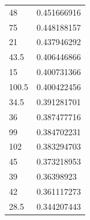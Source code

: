 \begin{longtable}{|l|l|}
	\rowcolor[HTML]{F8FF00} 
	48                                                      & 0.451666916                                                   \\
	\rowcolor[HTML]{F8FF00} 
	75                                                      & 0.448188157                                                   \\
	\rowcolor[HTML]{F8FF00} 
	21                                                      & 0.437946292                                                   \\
	\rowcolor[HTML]{F8FF00} 
	43.5                                                    & 0.406446866                                                   \\
	\rowcolor[HTML]{F8FF00} 
	15                                                      & 0.400731366                                                   \\
	\rowcolor[HTML]{F8FF00} 
	100.5                                                   & 0.400422456                                                   \\
	\rowcolor[HTML]{F8FF00} 
	34.5                                                    & 0.391281701                                                   \\
	\rowcolor[HTML]{F8FF00} 
	36                                                      & 0.387477716                                                   \\
	\rowcolor[HTML]{F8FF00} 
	99                                                      & 0.384702231                                                   \\
	\rowcolor[HTML]{F8FF00} 
	102                                                     & 0.383294703                                                   \\
	\rowcolor[HTML]{F8FF00} 
	45                                                      & 0.373218953                                                   \\
	\rowcolor[HTML]{F8FF00} 
	39                                                      & 0.36398923                                                    \\
	\rowcolor[HTML]{F8FF00} 
	42                                                      & 0.361117273                                                   \\
	\rowcolor[HTML]{F8FF00} 
	28.5                                                    & 0.344207443                                                   \\

\end{longtable}
